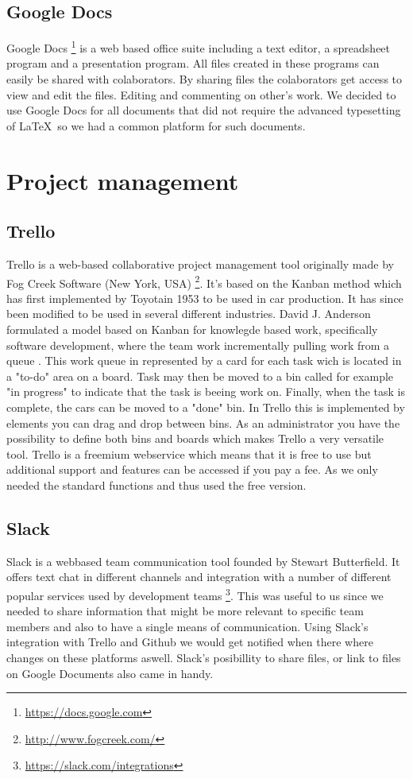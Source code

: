 \documentclass[11pt,a4paper,titlepage,oneside]{report}
\begin{document}
  \subsection{Google Docs}
  Google Docs \footnote{\url{https://docs.google.com}} is a web based office suite including a text editor, a spreadsheet program and a presentation program. All files created in these programs can easily be shared with colaborators. By sharing files the colaborators get access to view and edit the files. Editing and commenting on other's work. We decided to use Google Docs for all documents that did not require the advanced typesetting of \LaTeX~so we had a common platform for such documents.

\section{Project management}
  \subsection{Trello}
Trello is a web-based collaborative project management tool originally made by Fog Creek Software (New York, USA) \footnote{\url{http://www.fogcreek.com/}}. 
It's based on the Kanban method which has first implemented by Toyotain 1953 to be used in car production. It has since been modified to be used in several different industries. 
David J. Anderson formulated a model based on Kanban for knowlegde based work, specifically software development, where the team work incrementally pulling work from a queue \citep{da2004}. 
This work queue in represented by a card for each task wich is located in a "to-do" area on a board. Task may then be moved to a bin called for example "in progress" to indicate that the task is beeing work on. Finally, when the task is complete, the cars can be moved to a "done" bin. In Trello this is implemented by elements you can drag and drop between bins. As an administrator you have the possibility to define both bins and boards which makes Trello a very versatile tool.  
Trello is a freemium webservice which means that it is free to use but additional support and features can be accessed if you pay a fee. As we only needed the standard functions and thus used the free version.
  \subsection{Slack}
Slack is a webbased team communication tool founded by Stewart Butterfield. It offers text chat in different channels and integration with a number of different popular services used by development teams \footnote{\url{https://slack.com/integrations}}. This was useful to us since we needed to share information that might be more relevant to specific team members and also to have a single means of communication. Using Slack's integration with Trello and Github we would get notified when there where changes on these platforms aswell. Slack's posibillity to share files, or link to files on Google Documents also came in handy.
\end{document}
